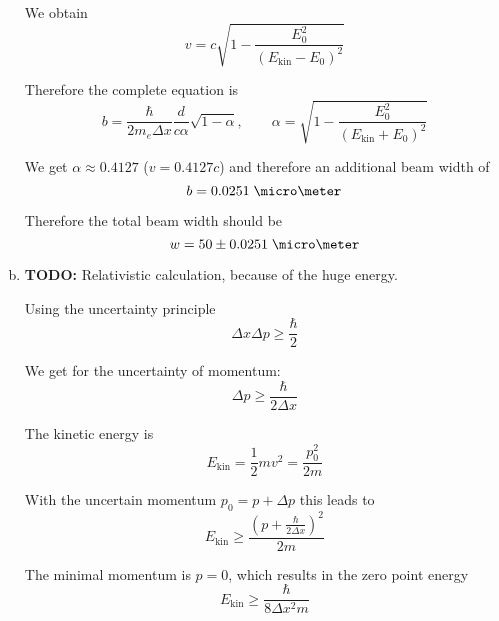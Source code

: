 \documentclass[a4paper,german,12pt,smallheadings]{scrartcl}
\begin{document}
\begin{enumerate}[a)]
    We obtain
    \begin{equation*}
      v = c \sqrt{1- \frac{E_0^2}{(E_\text{kin} - E_0)^2}}
    \end{equation*}

    Therefore the complete equation is
    \begin{equation*}
      b = \frac{\hbar}{2 m_e \Delta x} \frac{d}{c \alpha} \sqrt{1 - \alpha},\qquad \alpha = \sqrt{1 - \frac{E_0^2}{(E_\text{kin} + E_0)^2}}
    \end{equation*}

    We get $\alpha \approx 0.4127$ ($v = 0.4127 c$) and therefore an additional beam width of
    \begin{equation*}
      b = 0.0251 \;\micro \meter
    \end{equation*}

    Therefore the total beam width should be
    \begin{equation*}
      w = 50 \pm 0.0251 \; \micro \meter
    \end{equation*}


  \item
    \textbf{TODO:} Relativistic calculation, because of the huge energy.

    Using the uncertainty principle
    \begin{equation*}
      \Delta x \Delta p \ge \frac{\hbar}{2}
    \end{equation*}

    We get for the uncertainty of momentum:
    \begin{equation*}
      \Delta p \ge \frac{\hbar}{2 \Delta x}
    \end{equation*}

    The kinetic energy is
    \begin{equation*}
      E_\text{kin} = \frac{1}{2} mv^2 = \frac{p_0^2}{2m}
    \end{equation*}

    With the uncertain momentum $p_0 = p + \Delta p$ this leads to
    \begin{equation*}
      E_\text{kin} \ge \frac{(p + \frac{\hbar}{2 \Delta x})^2}{2m}
    \end{equation*}

    The minimal momentum is $p=0$, which results in the zero point energy
    \begin{equation*}
      E_\text{kin} \ge \frac{\hbar}{8 \Delta x^2 m}
    \end{equation*}


\end{enumerate}
\end{document}
